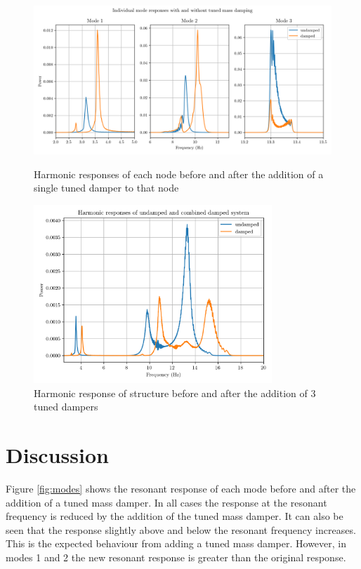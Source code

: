 \documentclass[8pt]{article}
\begin{document}
\begin{figure}[H]
    
    \centering
    \includegraphics[width=1\textwidth]{modes.png}
    \caption{\label{fig:modes} Harmonic responses of each node before and after the addition of a single tuned damper to that node}
    \includegraphics[width=0.8\textwidth]{combined_full_sweep.png}
    \caption{\label{fig:combined_full_sweep} Harmonic response of structure before and after the addition of 3 tuned dampers}
\end{figure}

\newpage
\section{Discussion}

Figure \ref{fig:modes} shows the resonant response of each mode before and after the addition of a tuned mass damper.
In all cases the response at the resonant frequency is reduced by the addition of the tuned mass damper. It can also be seen that the
response slightly above and below the resonant frequency increases. This is the expected behaviour from adding a tuned mass damper.
However, in modes 1 and 2 the new resonant response is greater than the original response.
\end{document}
